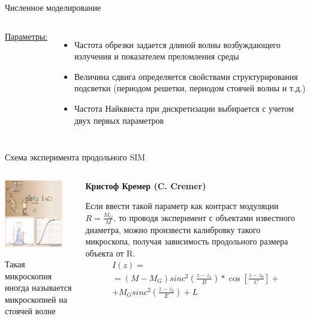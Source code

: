 \documentclass[9pt, compress, xcolor=table]{beamer}
\begin{document}
\begin{frame}{Численное моделирование}
\begin{columns}[c]
\underline{Параметры:}
\begin{itemize}
    \item Частота обрезки задается длиной волны возбуждающего излучения и показателем преломления среды
    \item Величина сдвига определяется свойствами структурирования подсветки (периодом решетки, периодом стоячей волны и  т.д.)
    \item Частота Найквиста при дискретизации выбирается с учетом двух первых параметров 
\end{itemize}
\end{columns}
\end{frame}


\begin{frame}{Схема эксперимента продольного SIM}
\begin{columns}[c]
\column{7cm}
\begin{center}
\includegraphics[width=0.85\textwidth]{ffm04}

{\small Такая микроскопия иногда называется микроскопией на стоячей волне}
\end{center}
\column{5.5cm}
\begin{center}
\textbf{ Кристоф Кремер (C. Cremer)}
 
 Если ввести такой параметр как контраст модуляции $R=\frac{M_G}{M}$, то проводя эксперимент с объектами известного диаметра, можно произвести калибровку такого микроскопа, получая зависимость продольного размера объекта от R.
 \begin{multline*}
 I(z)=\\=(M-M_G) sinc^2\left(\frac{z-z_1}{B}\right)*\cos[\frac{z-z_0}{C}]+\\+M_G sinc^2\left(\frac{z-z_2}{E}\right)+L
 \end{multline*}
 

\end{center}
\end{columns}
\end{frame}
\end{document}
